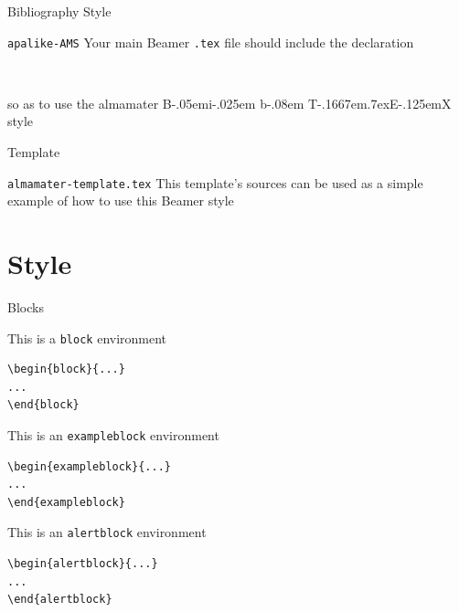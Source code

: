 \documentclass[presentation,\almamaterseal,apice]{beamer}\mode<presentation>{\usetheme{\almamaterpreset}}
\def\BibTeX{{\rm B\kern-.05em{\sc i\kern-.025em b}\kern-.08em
    T\kern-.1667em\lower.7ex\hbox{E}\kern-.125emX}}
\begin{document}
\begin{frame}[c,fragile]{Bibliography Style}
%
\begin{block}{\texttt{apalike-AMS}}
Your main Beamer \texttt{.tex} file should include the declaration
\begin{verbatim}
    
\end{verbatim}
so as to use the almamater \BibTeX{} style
\end{block}
%
\end{frame}

\begin{frame}[c,fragile]{Template}
%
\begin{block}{\texttt{almamater-template.tex}}
This template's sources can be used as a simple example of how to use this Beamer style
\end{block}
%
\end{frame}


\section{Style}





\begin{frame}[c,fragile]{Blocks}
%
\begin{block}{This is a \texttt{block} environment}
\begin{verbatim}
\begin{block}{...}
...
\end{block}
\end{verbatim}
\end{block}
%
\begin{exampleblock}{This is an \texttt{exampleblock} environment}
\begin{verbatim}
\begin{exampleblock}{...}
...
\end{exampleblock}
\end{verbatim}
\end{exampleblock}
%
\begin{alertblock}{This is an \texttt{alertblock} environment}
\begin{verbatim}
\begin{alertblock}{...}
...
\end{alertblock}
\end{verbatim}
\end{alertblock}
%
\end{frame}
\end{document}
